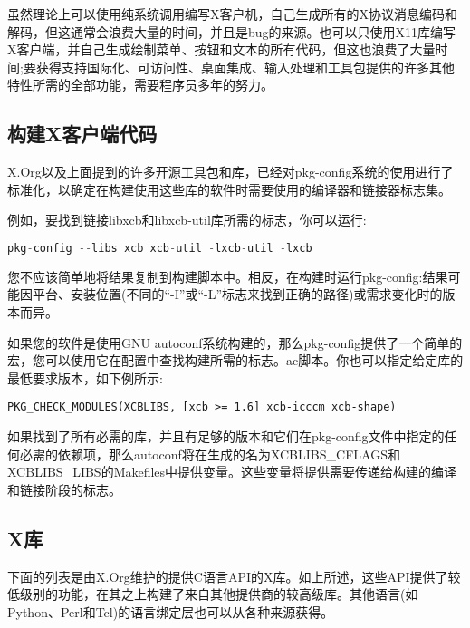 虽然理论上可以使用纯系统调用编写X客户机，自己生成所有的X协议消息编码和解码，但这通常会浪费大量的时间，并且是bug的来源。也可以只使用X11库编写X客户端，并自己生成绘制菜单、按钮和文本的所有代码，但这也浪费了大量时间;要获得支持国际化、可访问性、桌面集成、输入处理和工具包提供的许多其他特性所需的全部功能，需要程序员多年的努力。

\subsection{构建X客户端代码}

X.Org以及上面提到的许多开源工具包和库，已经对pkg-config系统的使用进行了标准化，以确定在构建使用这些库的软件时需要使用的编译器和链接器标志集。

\noindent 例如，要找到链接libxcb和libxcb-util库所需的标志，你可以运行:

\begin{lstlisting}[language=C]
pkg-config --libs xcb xcb-util -lxcb-util -lxcb
\end{lstlisting}

\vspace{-2em}

您不应该简单地将结果复制到构建脚本中。相反，在构建时运行pkg-config:结果可能因平台、安装位置(不同的“-I”或“-L”标志来找到正确的路径)或需求变化时的版本而异。

\noindent 如果您的软件是使用GNU autoconf系统构建的，那么pkg-config提供了一个简单的宏，您可以使用它在配置中查找构建所需的标志。ac脚本。你也可以指定给定库的最低要求版本，如下例所示:

\begin{lstlisting}
PKG_CHECK_MODULES(XCBLIBS, [xcb >= 1.6] xcb-icccm xcb-shape)
\end{lstlisting}

\vspace{-2em}

如果找到了所有必需的库，并且有足够的版本和它们在pkg-config文件中指定的任何必需的依赖项，那么autoconf将在生成的名为XCBLIBS\_CFLAGS和XCBLIBS\_LIBS的Makefiles中提供变量。这些变量将提供需要传递给构建的编译和链接阶段的标志。

\subsection{X库}

下面的列表是由X.Org维护的提供C语言API的X库。如上所述，这些API提供了较低级别的功能，在其之上构建了来自其他提供商的较高级库。其他语言(如Python、Perl和Tcl)的语言绑定层也可以从各种来源获得。


